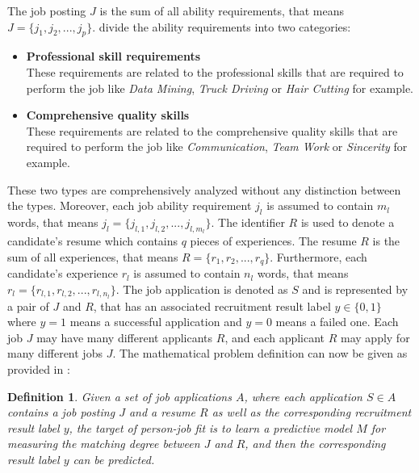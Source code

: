 \documentclass[draft,final]{thesisclass} %
\newtheorem{definition}{Definition}
\begin{document}
The job posting $J$ is the sum of all ability requirements, that means $J = \{j_1,j_2,...,j_p\}$.
\textcite[7]{pj_fit_ml} divide the ability requirements into two categories:
\begin{itemize}
    \item \textbf{Professional skill requirements}\\
    These requirements are related to the professional skills that are required to perform the job like \textit{Data Mining}, \textit{Truck Driving} or \textit{Hair Cutting} for example.
    \item \textbf{Comprehensive quality skills}\\
    These requirements are related to the comprehensive quality skills that are required to perform the job like \textit{Communication}, \textit{Team Work} or \textit{Sincerity} for example.
\end{itemize}
These two types are comprehensively analyzed without any distinction between the types.
Moreover, each job ability requirement $j_l$ is assumed to contain $m_l$ words, that means $j_l = \{j_{l,1},j_{l,2},...,j_{l,m_l}\}$.
The identifier $R$ is used to denote a candidate's resume which contains $q$ pieces of experiences.
The resume $R$ is the sum of all experiences, that means $R = \{r_1,r_2,...,r_q\}$.
Furthermore, each candidate's experience $r_l$ is assumed to contain $n_l$ words, that means $r_l = \{r_{l,1},r_{l,2},...,r_{l,n_l}\}$.
The job application is denoted as $S$ and is represented by a pair of $J$ and $R$, that has an associated recruitment result label $y \in \{0,1\}$ where $y = 1$ means a successful application and $y = 0$ means a failed one.
Each job $J$ may have many different applicants $R$, and each applicant $R$ may apply for many different jobs $J$.
The mathematical problem definition can now be given as provided in \textcite[8]{pj_fit_ml}:
\begin{definition}
    Given a set of job applications $A$, where each application $S \in A$ contains a job posting $J$ and a resume $R$ as well as the corresponding recruitment result label $y$, the target of person-job fit is to learn a predictive model $M$ for measuring the matching degree between $J$ and $R$, and then the corresponding result label $y$ can be predicted. 
\end{definition}
\end{document}
